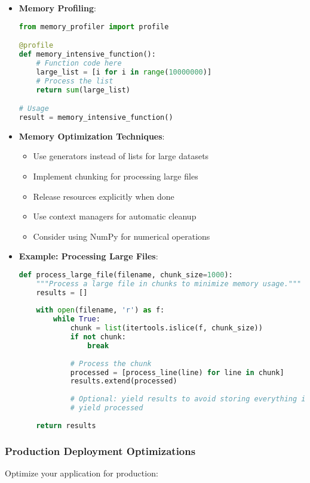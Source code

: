 \begin{itemize}
    \item \textbf{Memory Profiling}:
    \begin{lstlisting}[language=python]
from memory_profiler import profile

@profile
def memory_intensive_function():
    # Function code here
    large_list = [i for i in range(10000000)]
    # Process the list
    return sum(large_list)

# Usage
result = memory_intensive_function()
    \end{lstlisting}
    
    \item \textbf{Memory Optimization Techniques}:
    \begin{itemize}
        \item Use generators instead of lists for large datasets
        \item Implement chunking for processing large files
        \item Release resources explicitly when done
        \item Use context managers for automatic cleanup
        \item Consider using NumPy for numerical operations
    \end{itemize}
    
    \item \textbf{Example: Processing Large Files}:
    \begin{lstlisting}[language=python]
def process_large_file(filename, chunk_size=1000):
    """Process a large file in chunks to minimize memory usage."""
    results = []
    
    with open(filename, 'r') as f:
        while True:
            chunk = list(itertools.islice(f, chunk_size))
            if not chunk:
                break
                
            # Process the chunk
            processed = [process_line(line) for line in chunk]
            results.extend(processed)
            
            # Optional: yield results to avoid storing everything in memory
            # yield processed
    
    return results
    \end{lstlisting}
\end{itemize}

\subsubsection{Production Deployment Optimizations}
Optimize your application for production:

